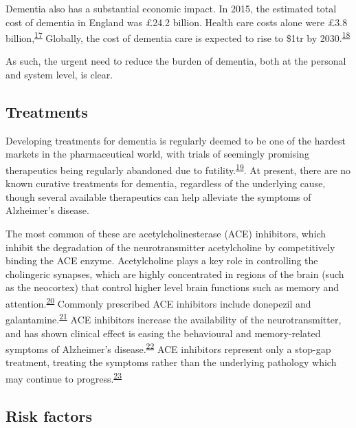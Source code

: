 \documentclass[a4paper, twoside]{templates/ociamthesis}
\begin{document}
Dementia also has a substantial economic impact. In 2015, the estimated total cost of dementia in England was £24.2 billion. Health care costs alone were £3.8 billion,\textsuperscript{\protect\hyperlink{ref-wittenberg2019}{17}} Globally, the cost of dementia care is expected to rise to \$1tr by 2030.\textsuperscript{\protect\hyperlink{ref-prince2014}{18}}

As such, the urgent need to reduce the burden of dementia, both at the personal and system level, is clear.

\hypertarget{intro-treatments}{%
\subsection{Treatments}\label{intro-treatments}}

Developing treatments for dementia is regularly deemed to be one of the hardest markets in the pharmaceutical world, with trials of seemingly promising therapeutics being regularly abandoned due to futility.\textsuperscript{\protect\hyperlink{ref-cummings2020}{19}}. At present, there are no known curative treatments for dementia, regardless of the underlying cause, though several available therapeutics can help alleviate the symptoms of Alzheimer's disease.

The most common of these are acetylcholinesterase (ACE) inhibitors, which inhibit the degradation of the neurotransmitter acetylcholine by competitively binding the ACE enzyme. Acetylcholine plays a key role in controlling the cholingeric synapses, which are highly concentrated in regions of the brain (such as the neocortex) that control higher level brain functions such as memory and attention.\textsuperscript{\protect\hyperlink{ref-hampel2018}{20}} Commonly prescribed ACE inhibitors include donepezil and galantamine.\textsuperscript{\protect\hyperlink{ref-pariente2008}{21}} ACE inhibitors increase the availability of the neurotransmitter, and has shown clinical effect is easing the behavioural and memory-related symptoms of Alzheimer's disease.\textsuperscript{\protect\hyperlink{ref-marucci2020}{22}} ACE inhibitors represent only a stop-gap treatment, treating the symptoms rather than the underlying pathology which may continue to progress.\textsuperscript{\protect\hyperlink{ref-francis2010}{23}}

\hypertarget{risk-factors}{%
\subsection{Risk factors}\label{risk-factors}}
\end{document}
